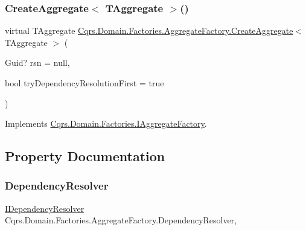 \subsubsection{\texorpdfstring{Create\+Aggregate$<$ T\+Aggregate $>$()}{CreateAggregate< TAggregate >()}}
{\footnotesize\ttfamily virtual T\+Aggregate \hyperlink{classCqrs_1_1Domain_1_1Factories_1_1AggregateFactory_aa60839e14ef01b3971067e1f154ee6b4_aa60839e14ef01b3971067e1f154ee6b4}{Cqrs.\+Domain.\+Factories.\+Aggregate\+Factory.\+Create\+Aggregate}$<$ T\+Aggregate $>$ (\begin{DoxyParamCaption}\item[{Guid?}]{rsn = {\ttfamily null},  }\item[{bool}]{try\+Dependency\+Resolution\+First = {\ttfamily true} }\end{DoxyParamCaption})\hspace{0.3cm}{\ttfamily [virtual]}}



Implements \hyperlink{interfaceCqrs_1_1Domain_1_1Factories_1_1IAggregateFactory_aa9723aadb2dfeae42287520d76f3a397_aa9723aadb2dfeae42287520d76f3a397}{Cqrs.\+Domain.\+Factories.\+I\+Aggregate\+Factory}.



\subsection{Property Documentation}
\mbox{\label{classCqrs_1_1Domain_1_1Factories_1_1AggregateFactory_acae0733e4069776322e0c4cb5d335c09_acae0733e4069776322e0c4cb5d335c09}} 
\subsubsection{\texorpdfstring{Dependency\+Resolver}{DependencyResolver}}
{\footnotesize\ttfamily \hyperlink{interfaceCqrs_1_1Configuration_1_1IDependencyResolver}{I\+Dependency\+Resolver} Cqrs.\+Domain.\+Factories.\+Aggregate\+Factory.\+Dependency\+Resolver\hspace{0.3cm}{\ttfamily [get]}, {\ttfamily [protected]}}

